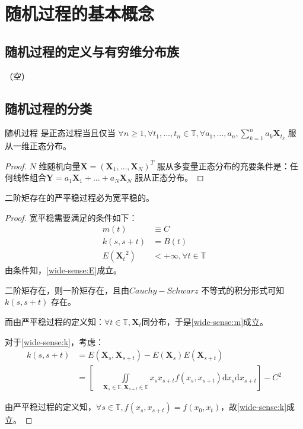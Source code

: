 \section{随机过程的基本概念}
    \subsection{随机过程的定义与有穷维分布族} 
    （空）
    \subsection{随机过程的分类}

    \begin{theorem}[正态过程充要条件]
        随机过程 \StochasticProcess 是正态过程当且仅当 $\forall n \geq 1, \forall t_1, \ldots, t_n \in \mathbb{T}, \forall a_1, \ldots, a_n, \sum\limits_{k=1}^{n} a_k \textbf{X}_{t_k} $ 服从一维正态分布。
    \end{theorem}

    \begin{proof}
        $N$ 维随机向量$\textbf{X} = (\textbf{X}_1, \ldots, \textbf{X}_N)^T$ 服从多变量正态分布的充要条件是：任何线性组合$\textbf{Y} = a_1 \textbf{X}_1 + \ldots + a_N \textbf{X}_N$ 服从正态分布。
    \end{proof}

    \begin{theorem}
        二阶矩存在的严平稳过程必为宽平稳的。
    \end{theorem}

    \begin{proof}
        宽平稳需要满足的条件如下：
        \begin{align}
            m(t) &\equiv C \label{wide-sense:m} \\
            k(s, s + t) &= B(t) \label{wide-sense:k}\\
            E({\textbf{X}_t}^2) &< +\infty , \forall t \in \mathbb{T} \label{wide-sense:E}
        \end{align}
        由条件知，\eqref{wide-sense:E}成立。

        二阶矩存在，则一阶矩存在，且由$Cauchy-Schwarz$ 不等式的积分形式可知 $k(s, s+t)$ 存在。

        而由严平稳过程的定义知：$\forall t \in \mathbb{T},\textbf{X}_t$同分布，于是\eqref{wide-sense:m}成立。

        对于\eqref{wide-sense:k}，考虑：
        \begin{align*}
            k(s, s + t) &= E(\textbf{X}_s, \textbf{X}_{s + t}) - E(\textbf{X}_s)E(\textbf{X}_{s+t}) \\
            &= \left[\quad \iint\limits_{\textbf{X}_s \in \mathbb{E}, \textbf{X}_{s+t} \in \mathbb{E}} x_s x_{s+t} f(x_s, x_{s+t}) \mathrm{d}x_s\mathrm{d}x_{s+t}\right] - C^2
        \end{align*}
        
        由严平稳过程的定义知，$\forall s \in \mathbb{T}, f(x_s, x_{s+t}) = f(x_0, x_t)$，故\eqref{wide-sense:k}成立。
    \end{proof}

